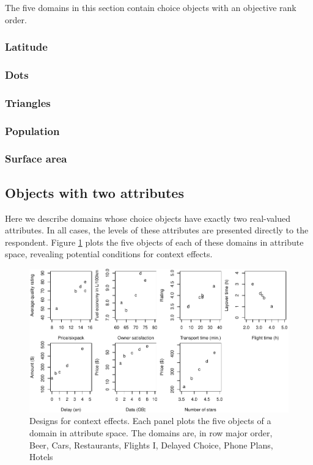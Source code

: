 \documentclass[11pt,letter]{article}
\begin{document}
The five domains in this section contain choice objects with an objective rank order.

\subsubsection{Latitude}



\subsubsection{Dots}



\subsubsection{Triangles}



\subsubsection{Population}



\subsubsection{Surface area}



\subsection{Objects with two attributes}

Here we describe domains whose choice objects have exactly two real-valued attributes.
In all cases, the levels of these attributes are presented directly to the respondent.
Figure \ref{f:CE} plots the five objects of each of these domains in attribute space, revealing potential conditions for context effects.

\begin{figure}
	\caption{Designs for context effects. Each panel plots the five objects of a domain in attribute space. The domains are, in row major order, Beer, Cars, Restaurants, Flights I, Delayed Choice, Phone Plans, Hotels}\label{f:CE}
	\centering
	\includegraphics[width=15cm]{./Figures/design_patterns.pdf}
\end{figure}
\end{document}
